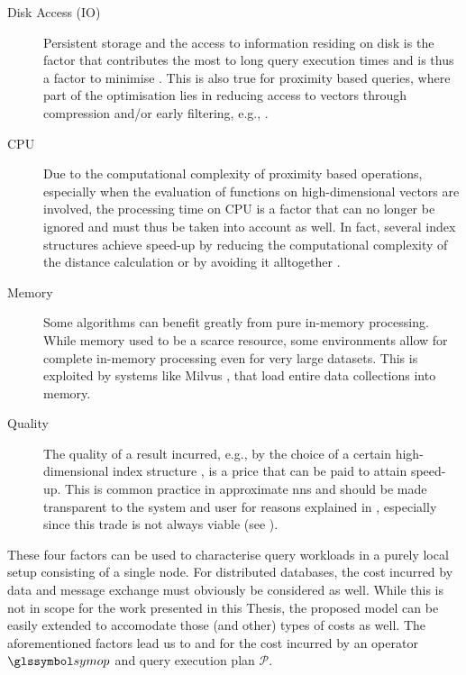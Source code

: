 \begin{description}
    \item[Disk Access (IO)] Persistent storage and the access to information residing on disk is the factor that contributes the most to long query execution times and is thus a factor to minimise \cite{Selinger:1979Access}. This is also true for proximity based queries, where part of the optimisation lies in reducing access to vectors through compression and/or early filtering, e.g., \cite{Weber:1998Va, Chierichetti:2007Finding}.
    \item[CPU] Due to the computational complexity of proximity based operations, especially when the evaluation of functions on high-dimensional vectors are involved, the processing time on CPU is a factor that can no longer be ignored and must thus be taken into account as well. In fact, several index structures achieve speed-up by reducing the computational complexity of the distance calculation \cite{Jegou:2010Product} or by avoiding it alltogether \cite{Weber:1998Va}.
    \item[Memory] Some algorithms can benefit greatly from pure in-memory processing. While memory used to be a scarce resource, some environments allow for complete in-memory processing even for very large datasets. This is exploited by systems like Milvus \cite{Wang:2021Milvus}, that load entire data collections into memory.
    \item[Quality] The quality of a result incurred, e.g., by the choice of a certain high-dimensional index structure \cite{Indyk1998:Approximate,Jegou:2010Product}, is a price that can be paid to attain speed-up. This is common practice in approximate \acrshort{nns} and should be made transparent to the system and user for reasons explained in , especially since this trade is not always viable (see ).
\end{description}

These four factors can be used to characterise query workloads in a purely local setup consisting of a single node. For distributed databases, the cost incurred by data and message exchange must obviously be considered as well. While this is not in scope for the work presented in this Thesis, the proposed model can be easily extended to accomodate those (and other) types of costs as well. The aforementioned factors lead us to  and  for the cost incurred by an operator $\symop$ and query execution plan $\mathcal{P}$.

